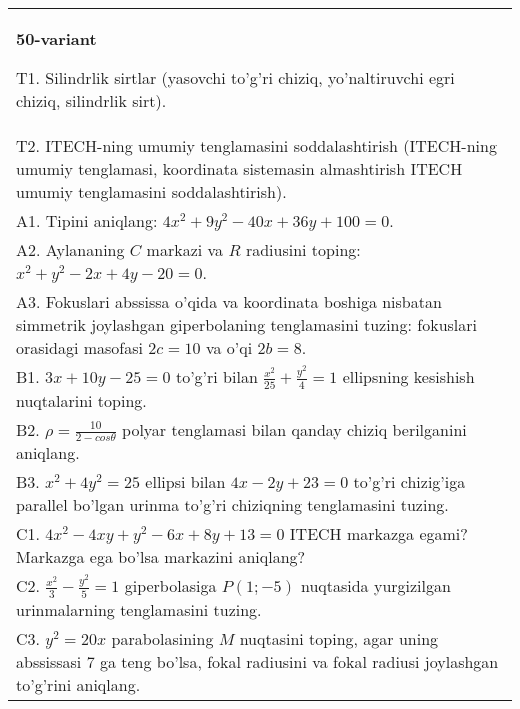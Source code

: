 \documentclass{article}
\begin{document}
\begin{tabular}{m{17cm}}
\textbf{50-variant}
\newline

T1. Silindrlik sirtlar (yasovchi to'g'ri chiziq, yo'naltiruvchi egri chiziq, silindrlik sirt).\\

T2. ITECH-ning umumiy tenglamasini soddalashtirish (ITECH-ning umumiy tenglamasi, koordinata sistemasin almashtirish ITECH umumiy tenglamasini soddalashtirish).\\

A1. Tipini aniqlang: $4x^2+9y^2-40x+36y+100=0$.\\

A2. Aylananing $C$ markazi va $R$ radiusini toping: $x^2+y^2-2x+4y-20=0$.\\

A3. Fokuslari abssissa o'qida va koordinata boshiga nisbatan simmetrik joylashgan giperbolaning tenglamasini tuzing: fokuslari orasidagi masofasi $2c=10$ va o'qi $2b=8$.\\

B1. $3x + 10y - 25 = 0$ to'g'ri bilan $\frac{x^{2}}{25} + \frac{y^{2}}{4} = 1$ ellipsning kesishish nuqtalarini toping.  \\

B2. $\rho = \frac{10}{2 - cos\theta}$ polyar tenglamasi bilan qanday chiziq berilganini aniqlang.  \\

B3. $x^{2} + 4y^{2} = 25$ ellipsi bilan $4x - 2y + 23 = 0$ to'g'ri chizig'iga parallel bo'lgan urinma to'g'ri chiziqning tenglamasini tuzing.  \\

C1. $4x^{2} - 4xy + y^{2} - 6x + 8y + 13 = 0$ ITECH markazga egami? Markazga ega bo'lsa markazini aniqlang?  \\

C2. $\frac{x^{2}}{3} - \frac{y^{2}}{5} = 1$ giperbolasiga $P(1; - 5)$ nuqtasida yurgizilgan urinmalarning tenglamasini tuzing.\\

C3. $y^{2} = 20x$ parabolasining $M$ nuqtasini toping, agar uning abssissasi 7 ga teng bo'lsa, fokal radiusini va fokal radiusi joylashgan to'g'rini aniqlang.\\

\end{tabular}
\vspace{1cm}
\end{document}
